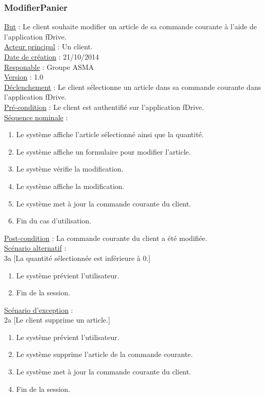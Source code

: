 \subsubsection{ModifierPanier}
	\underline{But} : Le client souhaite modifier un article de sa commande courante à l'aide de l'application fDrive.\\
	\underline{Acteur principal} : Un client.\\
	\underline{Date de création} : 21/10/2014\\
	\underline{Responable} : Groupe ASMA\\
	\underline{Version} : 1.0\\
	\underline{Déclenchement} : Le client sélectionne un article dans sa commande courante dans l'application fDrive.\\
	\underline{Pré-condition} : Le client est authentifié sur l'application fDrive.\\
	\underline{Séquence nominale} :
		\begin{enumerate}
			\item Le système affiche l’article sélectionné ainsi que la quantité.		
			\item Le système affiche un formulaire pour modifier l’article.
			\item Le système vérifie la modification.
			\item Le système affiche la modification.
			\item Le système met à jour la commande courante du client.
			\item Fin du cas d’utilisation.
		\end{enumerate}
	\underline{Post-condition} : La commande courante du client a été modifiée.\\
	\underline{Scénario alternatif} :\\
	 	3a [La quantité sélectionnée est inférieure à 0.]
		 	\begin{enumerate}[label=3a.\arabic* ]
		 		\item Le système prévient l'utilisateur.
		 		\item Fin de la session.
		 	\end{enumerate}
	\underline{Scénario d'exception} :\\
		2a [Le client supprime un article.]
			\begin{enumerate}[label=2a.\arabic* ]
				\item Le système prévient l'utilisateur.
				\item Le système supprime l'article de la commande courante.
				\item Le système met à jour la commande courante du client.
				\item Fin de la session.
			\end{enumerate}
